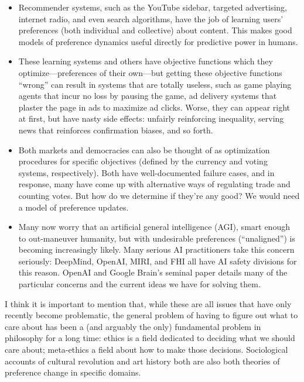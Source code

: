 \documentclass{article}
\theoremstyle{plain}
\theoremstyle{definition}
\theoremstyle{remark}
\begin{document}
	\begin{itemize}[]
		\item Recommender systems, such as the YouTube sidebar, targeted advertising, internet radio, and even search algorithms, have the job of learning users' preferences (both individual and collective) about content. This makes good models of preference dynamics useful directly for predictive power in humans.
		
		\item These learning systems and others have objective functions which they optimize---preferences of their own---but getting these objective functions ``wrong'' can result in systems that are totally useless, such as game playing agents that incur no loss by pausing the game, ad delivery systems that plaster the page in ads to maximize ad clicks. Worse, they can appear right at first, but have nasty side effects: unfairly reinforcing inequality, serving news that reinforces confirmation biases, and so forth.
		
		\item Both markets and democracies can also be thought of as optimization procedures for specific objectives (defined by the currency and voting systems, respectively). Both have well-documented failure cases, and in response, many have come up with alternative ways of regulating trade and counting votes. But how do we determine if they're any good? We would need a model of preference updates.
		
		\item  Many now worry that an artificial general intelligence (AGI), smart enough to out-maneuver humanity, but with undesirable preferences (``unaligned'') is becoming increasingly likely. Many serious AI practitioners take this concern seriously: DeepMind, OpenAI, MIRI, and FHI all have AI safety divisions for this reason. OpenAI and Google Brain's seminal paper \cite{amodei2016concrete} details many of the particular concerns and the current ideas we have for solving them.
		
	\end{itemize}

	I think it is important to mention that, while these are all issues that have only recently become problematic, the general problem of having to figure out what to care about has been a (and arguably the only) fundamental problem in philosophy for a long time: ethics is a field dedicated to deciding what we should care about; meta-ethics a field about how to make those decisions. Sociological accounts of cultural revolution and art history both are also both theories of preference change in specific domains.
	
\end{document}

